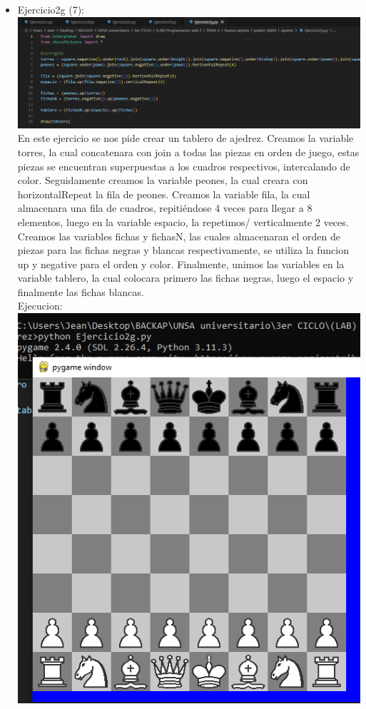 \documentclass[]{article}
\begin{document}
\begin{itemize}
            \item Ejercicio2g (7): \\
            \includegraphics[]{../img/img16.png}\\
            En este ejercicio se nos pide crear un tablero de ajedrez.
            Creamos la variable torres, la cual concatenara con join a todas las piezas en orden de juego, estas
            piezas se encuentran superpuestas a los cuadros respectivos, intercalando de color.
            Seguidamente creamos la variable peones, la cual creara con horizontalRepeat la fila de peones.
            Creamos la variable fila, la cual almacenara una fila de cuadros, repitiéndose 4 veces para llegar a 8 elementos, luego en la variable espacio, la repetimos/ verticalmente 2 veces.
            Creamos las variables fichas y fichasN, las cuales almacenaran el orden de piezas para las fichas
            negras y blancas respectivamente, se utiliza la funcion up y negative para el orden y color.
            Finalmente, unimos las variables en la variable tablero, la cual colocara primero las fichas negras,
            luego el espacio y finalmente las fichas blancas. \\
            Ejecucion:\\
            \includegraphics[]{../img/img17.png}\\
            
      \end{itemize}
\end{document}

